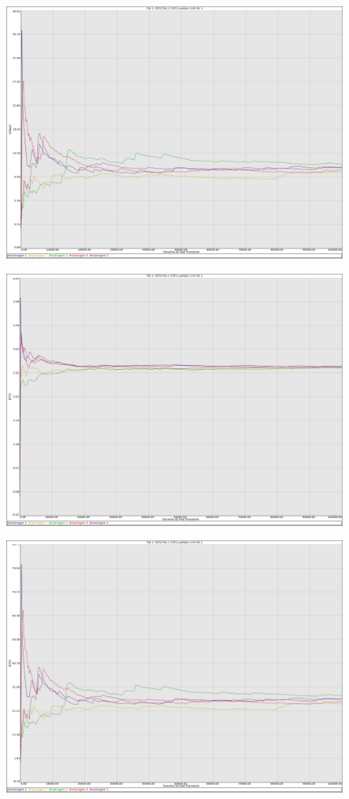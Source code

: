 \documentclass[a4paper,10pt]{article}
\begin{document}
\begin{figure}
\includegraphics[scale = 0.2]{./graficos_transiente_1/FCFS/04.png}
\end{figure}
\begin{figure}
\includegraphics[scale = 0.2]{./graficos_transiente_1/FCFS/05.png}
\end{figure}
\begin{figure}
\includegraphics[scale = 0.2]{./graficos_transiente_1/FCFS/06.png}
\end{figure}
\end{document}
